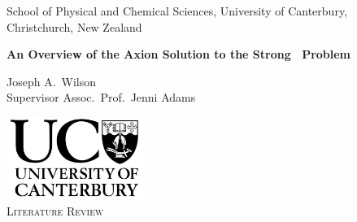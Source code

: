 
\begin{titlepage}


\begin{center} \linespread{0.9}
\Large School of Physical and Chemical Sciences, University of Canterbury, Christchurch, New Zealand
\end{center}

\vspace{3cm}

\begin{center}
\huge\bf
An Overview of the Axion Solution to the Strong \CP\ Problem
\end{center}


\begin{center} \linespread{1.5}
	\Large
	Joseph A.\ Wilson
\\	Supervisor Assoc.\ Prof.\ Jenni Adams
\end{center}

\iftrue
\vspace{3cm}
\centerline{}
\fi

\vfill

\begin{center} \linespread{1.5}
\includegraphics[width=45mm]{resources/UC.png} \\
\vspace{1ex}
\Large \textsc{Literature Review} \\
\end{center}
\vspace{4pt}

\vspace{2cm}

\end{titlepage}

\restoregeometry
